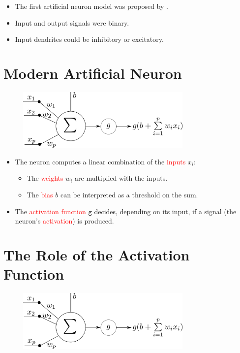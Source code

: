 \documentclass{book}
\newcommand{\act}{\texttt{g}}%
\newcommand{\alert}[1]{\textcolor{red}{#1}}
\begin{document}
\begin{itemize}
\item The first artificial neuron model was proposed by \cite{mcculloch_logical_1943}.
\item Input and output signals were binary.
\item Input dendrites could be inhibitory or excitatory.
\end{itemize}

\section{Modern Artificial Neuron}

\begin{figure}[h]
    \centering
    \includegraphics[height=3cm]{neurone}
\end{figure}

\begin{itemize}
\item The neuron computes a linear combination of the \alert{inputs} $x_i$:
    \begin{itemize}
    \item The \alert{weights} $w_i$ are multiplied with the inputs.
    \item The \alert{bias} $b$ can be interpreted as a threshold on the sum.
    \end{itemize}
\item The \alert{activation function} $\act$ decides, depending on its input, if a signal (the neuron's \alert{activation}) is produced.
\end{itemize}

\section{The Role of the Activation Function}

\begin{figure}[h]
    \centering
    \includegraphics[height=3cm]{neurone}
\end{figure}
\end{document}
